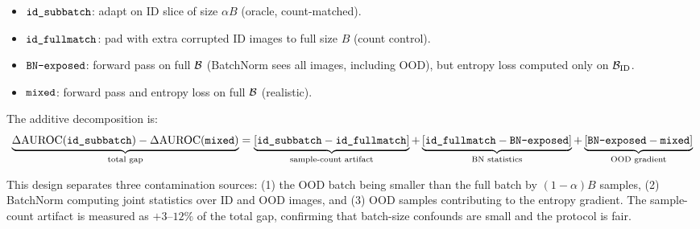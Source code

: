 \begin{itemize}[leftmargin=*,topsep=2pt,itemsep=1pt]
  \item $\texttt{id\_subbatch}$: adapt on ID slice of size $\alpha B$ (oracle, count-matched).
  \item $\texttt{id\_fullmatch}$: pad with extra corrupted ID images to full size $B$ (count control).
  \item $\texttt{BN-exposed}$: forward pass on full $\mathcal{B}$ (BatchNorm sees all images, including OOD), but entropy loss computed only on $\mathcal{B}_{\text{ID}}$.
  \item $\texttt{mixed}$: forward pass and entropy loss on full $\mathcal{B}$ (realistic).
\end{itemize}

The additive decomposition is:
\begin{equation}
  \underbrace{\Delta\text{AUROC}(\texttt{id\_subbatch}) - \Delta\text{AUROC}(\texttt{mixed})}_{\text{total gap}}
  = \underbrace{[\texttt{id\_subbatch} - \texttt{id\_fullmatch}]}_{\text{sample-count artifact}}
  + \underbrace{[\texttt{id\_fullmatch} - \texttt{BN-exposed}]}_{\text{BN statistics}}
  + \underbrace{[\texttt{BN-exposed} - \texttt{mixed}]}_{\text{OOD gradient}}
  \label{eq:decomp}
\end{equation}

This design separates three contamination sources: (1) the OOD batch being smaller than the full batch by $(1-\alpha)B$ samples, (2) BatchNorm computing joint statistics over ID and OOD images, and (3) OOD samples contributing to the entropy gradient.
The sample-count artifact is measured as $+3$--$12\%$ of the total gap, confirming that batch-size confounds are small and the protocol is fair.
